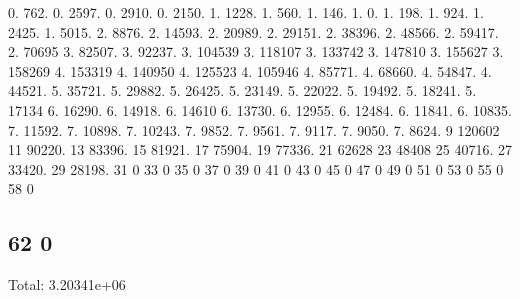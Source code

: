 0. 762. 0. 2597. 0. 2910. 0. 2150. 1. 1228. 1. 560. 1. 146. 1. 0. 1. 198. 1. 924. 1. 2425. 1. 5015. 2. 8876. 2. 14593. 2. 20989. 2. 29151. 2. 38396. 2. 48566. 2. 59417. 2. 70695 3. 82507. 3. 92237. 3. 104539 3. 118107 3. 133742 3. 147810 3. 155627 3. 158269 4. 153319 4. 140950 4. 125523 4. 105946 4. 85771. 4. 68660. 4. 54847. 4. 44521. 5. 35721. 5. 29882. 5. 26425. 5. 23149. 5. 22022. 5. 19492. 5. 18241. 5. 17134 6. 16290. 6. 14918. 6. 14610 6. 13730. 6. 12955. 6. 12484. 6. 11841. 6. 10835. 7. 11592. 7. 10898. 7. 10243. 7. 9852. 7. 9561. 7. 9117. 7. 9050. 7. 8624. 9 120602 11 90220. 13 83396. 15 81921. 17 75904. 19 77336. 21 62628 23 48408 25 40716. 27 33420. 29 28198. 31 0 33 0 35 0 37 0 39 0 41 0 43 0 45 0 47 0 49 0 51 0 53 0 55 0 58 0 \subsection*{62 0 }

Total\+: 3.\+20341e+06 